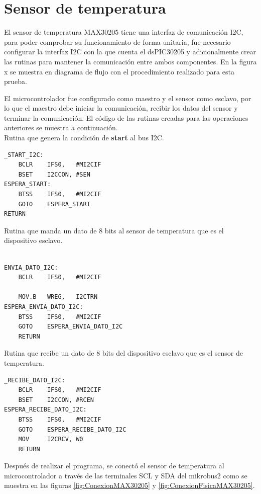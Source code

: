 \section{Sensor de temperatura}

El sensor de temperatura MAX30205 tiene una interfaz de comunicación I2C, para poder comprobar su funcionamiento de forma unitaria, fue necesario configurar la interfaz I2C con la que cuenta el dsPIC30205 y adicionalmente crear las rutinas para mantener la comunicación entre ambos componentes. En la figura x se muestra en diagrama de flujo con el procedimiento realizado para esta prueba.\\

{\Large {}}

El microcontrolador fue configurado como maestro y el sensor como esclavo, por lo que el maestro debe iniciar la comunicación, recibir los datos del sensor y terminar la comunicación. El código de las rutinas creadas para las operaciones anteriores se muestra a continuación.\\

Rutina que genera la condición de \textbf{start} al bus I2C.
{\small
\begin{lstlisting}[frame=single]
_START_I2C:
	BCLR	IFS0,	#MI2CIF
	BSET	I2CCON,	#SEN
ESPERA_START:
	BTSS	IFS0,	#MI2CIF
	GOTO	ESPERA_START
RETURN
\end{lstlisting}
}


Rutina que manda un dato de 8 bits al sensor de temperatura que es el dispositivo esclavo.	
{\small
\begin{lstlisting}[frame=single]

ENVIA_DATO_I2C:
	BCLR	IFS0,	#MI2CIF
	
	MOV.B	WREG,	I2CTRN
ESPERA_ENVIA_DATO_I2C:
	BTSS	IFS0,	#MI2CIF
	GOTO	ESPERA_ENVIA_DATO_I2C
	RETURN
\end{lstlisting}
}

Rutina que recibe un dato de 8 bits del dispositivo esclavo que es el sensor de temperatura.
{\small
\begin{lstlisting}[frame=single]
_RECIBE_DATO_I2C:
	BCLR	IFS0,	#MI2CIF
	BSET	I2CCON,	#RCEN
ESPERA_RECIBE_DATO_I2C:
	BTSS	IFS0,	#MI2CIF
	GOTO	ESPERA_RECIBE_DATO_I2C
	MOV		I2CRCV,	W0	
	RETURN
\end{lstlisting}
}

Después de realizar el programa, se conectó el sensor de temperatura al microcontrolador a través de las terminales SCL y SDA del mikrobus2 como se muestra en las figuras \ref{fig:ConexionMAX30205} y \ref{fig:ConexionFisicaMAX30205}.\\

